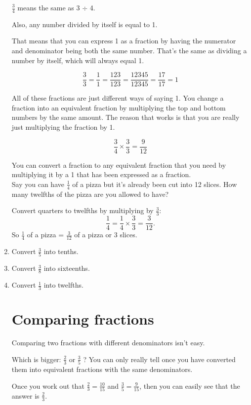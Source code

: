 \documentclass[14pt]{article}
\begin{document}
\begin{enumerate}
$\frac{3}{4}$ means the same as 3 $\div$ 4.

Also, any number divided by itself is equal to 1.

That means that you can express 1 as a fraction by having the numerator and denominator being both the same number. That's the same as dividing a number by itself, which will always equal 1.

$$\frac{3}{3} = \frac{1}{1} = \frac{123}{123} = \frac{12345}{12345} = \frac{17}{17} = 1$$

All of these fractions are just different ways of saying 1. You change a fraction into an equivalent fraction by multiplying the top and bottom numbers by the same amount. The reason that works is that you are really just multiplying the fraction by 1.

$$\frac{3}{4} \times \frac{3}{3} = \frac{9}{12}$$

You can convert a fraction to any equivalent fraction that you need by multiplying it by a 1 that has been expressed as a fraction.\\

Say you can have $\frac{1}{4}$ of a pizza but it's already been cut into 12 slices. How many twelfths of the pizza are you allowed to have?

Convert quarters to twelfths by multiplying by $\frac{3}{3}:$\\
$$\frac{1}{4}=\frac{1}{4}\times\frac{3}{3}=\frac{3}{12}.$$
So $\frac{1}{4}$ of a pizza = $\frac{3}{12}$ of a pizza or 3 slices.\\

\item Convert $\frac{3}{5}$ into tenths.
\item Convert $\frac{3}{8}$ into sixteenths.
\item Convert $\frac{1}{3}$ into twelfths.

\section{Comparing fractions}
Comparing two fractions with different denominators isn’t easy.

Which is bigger: $\frac{2}{3}$ or $\frac{3}{5}$ ? You can only really tell once you have converted them into equivalent fractions with the same denominators.

Once you work out that $\frac{2}{3} = \frac{10}{15}$ and $\frac{3}{5} = \frac{9}{15}$, then you can easily see that the answer is $\frac{2}{3}$.


\end{enumerate}
\end{document}
